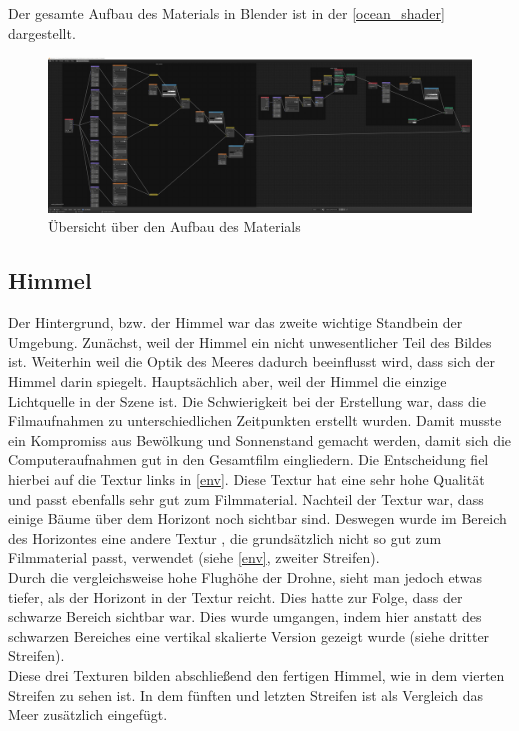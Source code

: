 Der gesamte Aufbau des Materials in Blender ist in der \autoref{ocean_shader} dargestellt.

\begin{figure}[H]
\includegraphics[width=\textwidth]{gfx/prod/env/ocean_shader.jpg}
\caption{Übersicht über den Aufbau des Materials}
\label{ocean_shader}
\end{figure}

\subsection{Himmel}

Der Hintergrund, bzw. der Himmel war das zweite wichtige Standbein der Umgebung. Zunächst, weil der Himmel ein nicht unwesentlicher Teil des Bildes ist. Weiterhin weil die Optik des Meeres dadurch beeinflusst wird, dass sich der Himmel darin spiegelt. Hauptsächlich aber, weil der Himmel die einzige Lichtquelle in der Szene ist. Die Schwierigkeit bei der Erstellung war, dass die Filmaufnahmen zu unterschiedlichen Zeitpunkten erstellt wurden. Damit musste ein Kompromiss aus Bewölkung und Sonnenstand gemacht werden, damit sich die Computeraufnahmen gut in den Gesamtfilm eingliedern. Die Entscheidung fiel hierbei auf die Textur links in \autoref{env}. Diese Textur hat eine sehr hohe Qualität und passt ebenfalls sehr gut zum Filmmaterial. Nachteil der Textur war, dass einige Bäume über dem Horizont noch sichtbar sind. Deswegen wurde im Bereich des Horizontes eine andere Textur , die grundsätzlich nicht so gut zum Filmmaterial passt, verwendet (siehe \autoref{env}, zweiter Streifen).\\
Durch die vergleichsweise hohe Flughöhe der Drohne, sieht man jedoch etwas tiefer, als der Horizont in der Textur reicht. Dies hatte zur Folge, dass der schwarze Bereich sichtbar war. Dies wurde umgangen, indem hier anstatt des schwarzen Bereiches eine vertikal skalierte Version gezeigt wurde (siehe dritter Streifen).\\
Diese drei Texturen bilden abschließend den fertigen Himmel, wie in dem vierten Streifen zu sehen ist. In dem fünften und letzten Streifen ist als Vergleich das Meer zusätzlich eingefügt.

